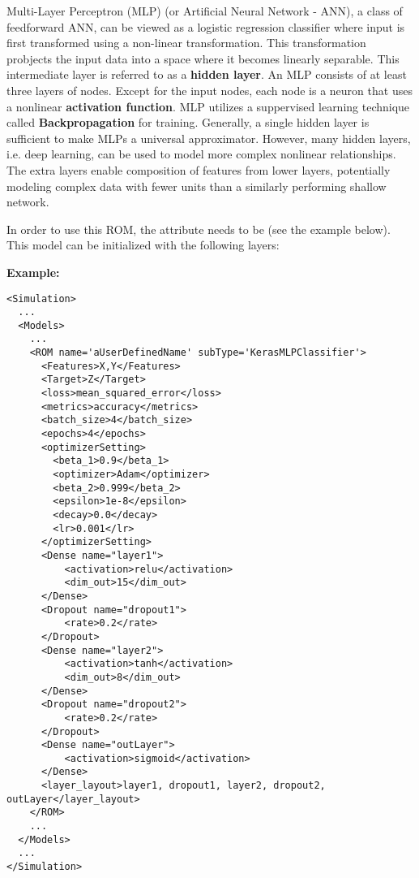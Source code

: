 Multi-Layer Perceptron (MLP) (or Artificial Neural Network - ANN), a class of feedforward
ANN, can be viewed as a logistic regression classifier where input is first transformed
using a non-linear transformation. This transformation probjects the input data into a
space where it becomes linearly separable. This intermediate layer is referred to as a
\textbf{hidden layer}. An MLP consists of at least three layers of nodes. Except for the
input nodes, each node is a neuron that uses a nonlinear \textbf{activation function}. MLP
utilizes a suppervised learning technique called \textbf{Backpropagation} for training.
Generally, a single hidden layer is sufficient to make MLPs a universal approximator.
However, many hidden layers, i.e. deep learning, can be used to model more complex nonlinear
relationships. The extra layers enable composition of features from lower layers, potentially
modeling complex data with fewer units than a similarly performing shallow network.


In order to use this ROM, the  attribute  needs to
be  (see the example below). This model can be initialized with
the following layers:

\begin{itemize}
  \DenseLayer
  \DropoutLayer
\end{itemize}

\textbf{Example:}
\begin{lstlisting}[style=XML,morekeywords={name,subType}]
<Simulation>
  ...
  <Models>
    ...
    <ROM name='aUserDefinedName' subType='KerasMLPClassifier'>
      <Features>X,Y</Features>
      <Target>Z</Target>
      <loss>mean_squared_error</loss>
      <metrics>accuracy</metrics>
      <batch_size>4</batch_size>
      <epochs>4</epochs>
      <optimizerSetting>
        <beta_1>0.9</beta_1>
        <optimizer>Adam</optimizer>
        <beta_2>0.999</beta_2>
        <epsilon>1e-8</epsilon>
        <decay>0.0</decay>
        <lr>0.001</lr>
      </optimizerSetting>
      <Dense name="layer1">
          <activation>relu</activation>
          <dim_out>15</dim_out>
      </Dense>
      <Dropout name="dropout1">
          <rate>0.2</rate>
      </Dropout>
      <Dense name="layer2">
          <activation>tanh</activation>
          <dim_out>8</dim_out>
      </Dense>
      <Dropout name="dropout2">
          <rate>0.2</rate>
      </Dropout>
      <Dense name="outLayer">
          <activation>sigmoid</activation>
      </Dense>
      <layer_layout>layer1, dropout1, layer2, dropout2, outLayer</layer_layout>
    </ROM>
    ...
  </Models>
  ...
</Simulation>
\end{lstlisting}

